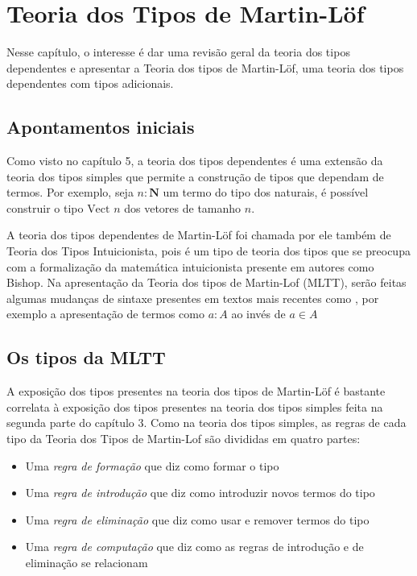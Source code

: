 \documentclass[../main.tex]{subfiles}
\begin{document}
\section{Teoria dos Tipos de Martin-Löf}

Nesse capítulo, o interesse é dar uma revisão geral da teoria dos tipos dependentes e apresentar a Teoria dos tipos de Martin-Löf, uma teoria dos tipos dependentes com tipos adicionais. 

\subsection{Apontamentos iniciais}

Como visto no capítulo 5, a teoria dos tipos dependentes é uma extensão da teoria dos tipos simples que permite a construção de tipos que dependam de termos. Por exemplo, seja $n : \mathbf{N}$ um termo do tipo dos naturais, é possível construir o tipo $\text{Vect } n$ dos vetores de tamanho $n$.

A teoria dos tipos dependentes de Martin-Löf foi chamada por ele também de Teoria dos Tipos Intuicionista, pois é um tipo de teoria dos tipos que se preocupa com a formalização da matemática intuicionista presente em autores como Bishop. Na apresentação da Teoria dos tipos de Martin-Lof (MLTT), serão feitas algumas mudanças de sintaxe presentes em textos mais recentes como \cite{rijke2022}, por exemplo a apresentação de termos como $a : A$ ao invés de $a \in A$

\subsection{Os tipos da MLTT}

A exposição dos tipos presentes na teoria dos tipos de Martin-Löf é bastante correlata à exposição dos tipos presentes na teoria dos tipos simples feita na segunda parte do capítulo 3. Como na teoria dos tipos simples, as regras de cada tipo da Teoria dos Tipos de Martin-Lof são divididas em quatro partes: 

\begin{itemize}
    \item Uma \emph{regra de formação} que diz como formar o tipo
    \item Uma \emph{regra de introdução} que diz como introduzir novos termos do tipo
    \item Uma \emph{regra de eliminação} que diz como usar e remover termos do tipo
    \item Uma \emph{regra de computação} que diz como as regras de introdução e de eliminação se relacionam
\end{itemize}
\end{document}
